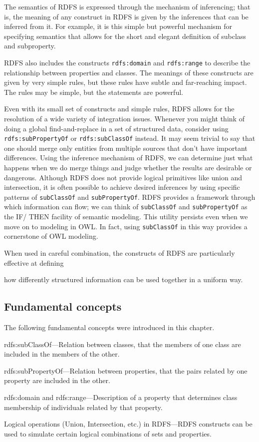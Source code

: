 The semantics of RDFS is expressed through the mechanism of inferencing;
that is, the meaning of any construct in RDFS is given by the inferences
that can be inferred from it. For example, it is this simple but
powerful mechanism for specifying semantics that allows for the short
and elegant definition of subclass and subproperty.

RDFS also includes the constructs \texttt{rdfs:domain} and \texttt{rdfs:range} to describe
the relationship between properties and classes. The meanings of these
constructs are given by very simple rules, but these rules have subtle
and far-reaching impact. The rules may be simple, but the statements are
powerful.

Even with its small set of constructs and simple rules, RDFS allows for
the resolution of a wide variety of integration issues. Whenever you
might think of doing a global find-and-replace in a set of structured
data, consider using \texttt{rdfs:subPropertyOf} or \texttt{rdfs:subClassOf} instead. It
may seem trivial to say that one should merge only entities from
multiple sources that don't have important differences. Using the
inference mechanism of RDFS, we can determine just what happens when we
do merge things and judge whether the results are desirable or
dangerous. Although RDFS does not provide logical primitives like union
and intersection, it is often possible to achieve desired inferences by
using specific patterns of \texttt{subClassOf} and \texttt{subPropertyOf}. RDFS provides a
framework through which information can flow; we can think of \texttt{subClassOf}
and \texttt{subPropertyOf} as the IF/ THEN facility of semantic modeling. This
utility persists even when we move on to modeling in OWL. In fact, using
\texttt{subClassOf} in this way provides a cornerstone of OWL modeling.

When used in careful combination, the constructs of RDFS are
particularly effective at defining

how differently structured information can be used together in a uniform
way.

\subsection{Fundamental concepts}

The following fundamental concepts were introduced in this chapter.

rdfs:subClassOf---Relation between classes, that the members of one
class are included in the members of the other.

rdfs:subPropertyOf---Relation between properties, that the pairs related
by one property are included in the other.

rdfs:domain and rdfs:range---Description of a property that determines
class membership
of individuals related by that property.

Logical operations (Union, Intersection, etc.) in RDFS---RDFS constructs
can be used to simulate certain logical combinations of sets and
properties.
